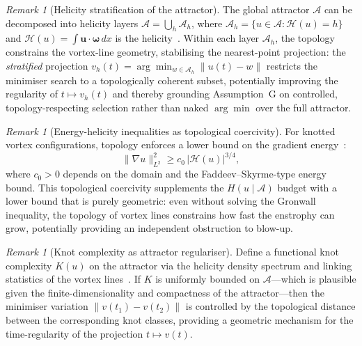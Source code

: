\documentclass[12pt,a4paper]{article}
\theoremstyle{definition}
\theoremstyle{plain}
\theoremstyle{remark}
\newtheorem{remark}[definition]{Remark}
\begin{document}
\begin{remark}[Helicity stratification of the attractor]
\label{rem:helicity-stratification}
The global attractor $\mathcal{A}$ can be decomposed into helicity
layers $\mathcal{A} = \bigcup_h \mathcal{A}_h$, where
$\mathcal{A}_h = \{ u \in \mathcal{A} : \mathcal{H}(u) = h \}$ and
$\mathcal{H}(u) = \int \mathbf{u} \cdot \boldsymbol{\omega}\, dx$
is the helicity~\cite{Moffatt69, ArnoldKhesin98}. Within each layer
$\mathcal{A}_h$, the topology constrains the vortex-line geometry,
stabilising the nearest-point projection: the \emph{stratified}
projection $v_h(t) = \arg\min_{w \in \mathcal{A}_h} \|u(t) - w\|$
restricts the minimiser search to a topologically coherent subset,
potentially improving the regularity of $t \mapsto v_h(t)$ and thereby
grounding Assumption~G on controlled, topology-respecting selection
rather than naked $\arg\min$ over the full attractor.
\end{remark}

\begin{remark}[Energy-helicity inequalities as topological coercivity]
\label{rem:helicity-energy-bounds}
For knotted vortex configurations, topology enforces a lower bound on
the gradient energy~\cite{ArnoldKhesin98}:
\[
  \|\nabla u\|_{L^2}^2 \geq c_0 \, |\mathcal{H}(u)|^{3/4},
\]
where $c_0 > 0$ depends on the domain and the Faddeev--Skyrme-type
energy bound. This topological coercivity supplements the
$H(u \mid \mathcal{A})$ budget with a lower bound that is purely
geometric: even without solving the Gronwall inequality, the
topology of vortex lines constrains how fast the enstrophy can grow,
potentially providing an independent obstruction to blow-up.
\end{remark}

\begin{remark}[Knot complexity as attractor regulariser]
\label{rem:knot-complexity}
Define a functional knot complexity $K(u)$ on the attractor via
the helicity density spectrum and linking statistics of the vortex
lines~\cite{Moffatt69}. If $K$ is uniformly bounded on
$\mathcal{A}$---which is plausible given the finite-dimensionality
and compactness of the attractor---then the minimiser variation
$\|v(t_1) - v(t_2)\|$ is controlled by the topological distance
between the corresponding knot classes, providing a geometric
mechanism for the time-regularity of the projection
$t \mapsto v(t)$.
\end{remark}
\end{document}
